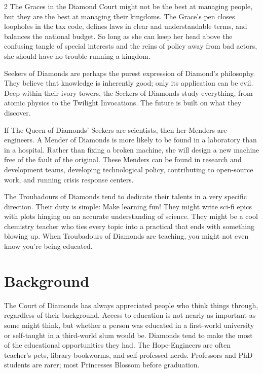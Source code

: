 \begin{multicols}{2}
The Graces in the Diamond Court might not be the best at managing people, but they are the best at managing their kingdoms. The Grace's pen closes loopholes in the tax code, defines laws in clear and understandable terms, and balances the national budget. So long as she can keep her head above the confusing tangle of special interests and the reins of policy away from bad actors, she should have no trouble running a kingdom.

Seekers of Diamonds are perhaps the purest expression of Diamond's philosophy. They believe that knowledge is inherently good; only its application can be evil. Deep within their ivory towers, the Seekers of Diamonds study everything, from atomic physics to the Twilight Invocations. The future is built on what they discover.

If The Queen of Diamonds' Seekers are scientists, then her Menders are engineers. A Mender of Diamonds is more likely to be found in a laboratory than in a hospital. Rather than fixing a broken machine, she will design a new machine free of the fault of the original. These Menders can be found in research and development teams, developing technological policy, contributing to open-source work, and running crisis response centers.

The Troubadours of Diamonds tend to dedicate their talents in a very specific direction. Their duty is simple: Make learning fun! They might write sci-fi epics with plots hinging on an accurate understanding of science. They might be a cool chemistry teacher who ties every topic into a practical that ends with something blowing up. When Troubadours of Diamonds are teaching, you might not even know you're being educated.

\section*{Background}

The Court of Diamonds has always appreciated people who think things through, regardless of their background. Access to education is not nearly as important as some might think, but whether a person was educated in a first-world university or self-taught in a third-world slum would be. Diamonds tend to make the most of the educational opportunities they had. The Hope-Engineers are often teacher's pets, library bookworms, and self-professed nerds. Professors and PhD students are rarer; most Princesses Blossom before graduation. 


\end{multicols}

